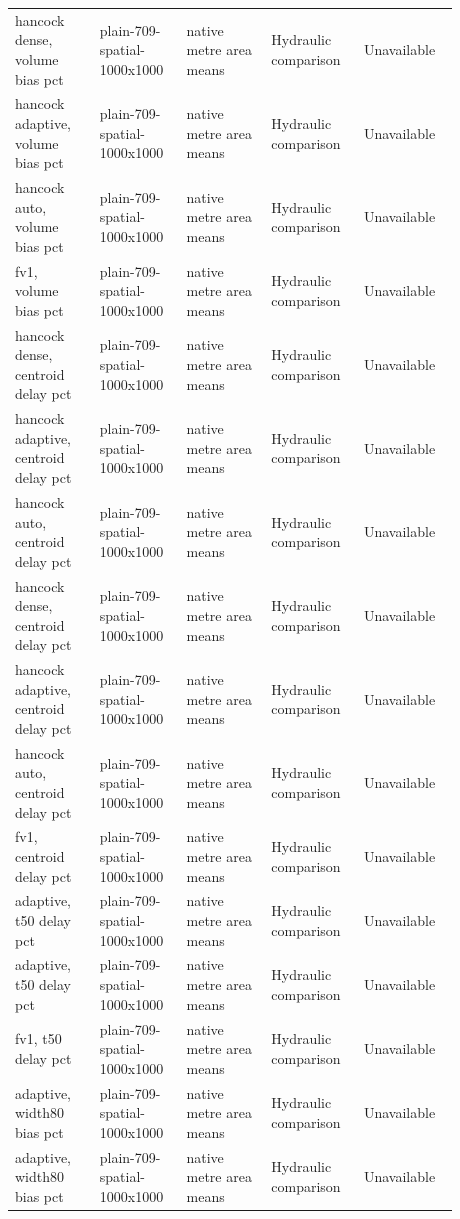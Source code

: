 \begin{longtable}{p{0.1760\linewidth}p{0.1760\linewidth}p{0.1760\linewidth}p{0.1760\linewidth}p{0.1760\linewidth}}
hancock dense, volume bias pct & plain-709-spatial-1000x1000 & native metre area means & Hydraulic comparison & Unavailable \\
hancock adaptive, volume bias pct & plain-709-spatial-1000x1000 & native metre area means & Hydraulic comparison & Unavailable \\
hancock auto, volume bias pct & plain-709-spatial-1000x1000 & native metre area means & Hydraulic comparison & Unavailable \\
fv1, volume bias pct & plain-709-spatial-1000x1000 & native metre area means & Hydraulic comparison & Unavailable \\
hancock dense, centroid delay pct & plain-709-spatial-1000x1000 & native metre area means & Hydraulic comparison & Unavailable \\
hancock adaptive, centroid delay pct & plain-709-spatial-1000x1000 & native metre area means & Hydraulic comparison & Unavailable \\
hancock auto, centroid delay pct & plain-709-spatial-1000x1000 & native metre area means & Hydraulic comparison & Unavailable \\
hancock dense, centroid delay pct & plain-709-spatial-1000x1000 & native metre area means & Hydraulic comparison & Unavailable \\
hancock adaptive, centroid delay pct & plain-709-spatial-1000x1000 & native metre area means & Hydraulic comparison & Unavailable \\
hancock auto, centroid delay pct & plain-709-spatial-1000x1000 & native metre area means & Hydraulic comparison & Unavailable \\
fv1, centroid delay pct & plain-709-spatial-1000x1000 & native metre area means & Hydraulic comparison & Unavailable \\
adaptive, t50 delay pct & plain-709-spatial-1000x1000 & native metre area means & Hydraulic comparison & Unavailable \\
adaptive, t50 delay pct & plain-709-spatial-1000x1000 & native metre area means & Hydraulic comparison & Unavailable \\
fv1, t50 delay pct & plain-709-spatial-1000x1000 & native metre area means & Hydraulic comparison & Unavailable \\
adaptive, width80 bias pct & plain-709-spatial-1000x1000 & native metre area means & Hydraulic comparison & Unavailable \\
adaptive, width80 bias pct & plain-709-spatial-1000x1000 & native metre area means & Hydraulic comparison & Unavailable \\

\end{longtable}
